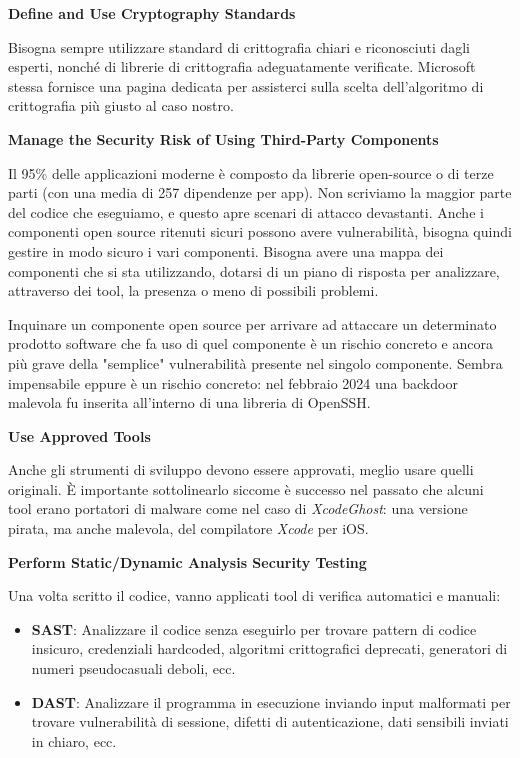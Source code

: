\textbf{Define and Use Cryptography Standards}

Bisogna sempre utilizzare standard di crittografia chiari e riconosciuti dagli esperti, 
nonché di librerie di crittografia adeguatamente verificate. Microsoft stessa fornisce 
una pagina dedicata per assisterci sulla scelta dell'algoritmo di crittografia più 
giusto al caso nostro.

\textbf{Manage the Security Risk of Using Third-Party Components}

Il 95\% delle applicazioni moderne è composto da librerie open-source o di terze 
parti (con una media di 257 dipendenze per app). Non scriviamo la maggior parte del 
codice che eseguiamo, e questo apre scenari di attacco devastanti. Anche i componenti 
open source ritenuti sicuri possono avere vulnerabilità, bisogna quindi gestire in 
modo sicuro i vari componenti. Bisogna avere una mappa dei componenti che si sta 
utilizzando, dotarsi di un piano di risposta per analizzare, attraverso dei tool, la 
presenza o meno di possibili problemi. 

Inquinare un componente open source per arrivare ad attaccare un determinato prodotto 
software che fa uso di quel componente è un rischio concreto e ancora più grave della 
"semplice" vulnerabilità presente nel singolo componente. Sembra impensabile eppure è un 
rischio concreto: nel febbraio 2024 una backdoor malevola fu inserita all'interno di una 
libreria di OpenSSH.

\textbf{Use Approved Tools}

Anche gli strumenti di sviluppo devono essere approvati, meglio usare quelli originali.
È importante sottolinearlo siccome è successo nel passato che alcuni tool erano portatori
di malware come nel caso di \textit{XcodeGhost}: una versione pirata, ma anche malevola, 
del compilatore \textit{Xcode} per iOS.

\textbf{Perform Static/Dynamic Analysis Security Testing}

Una volta scritto il codice, vanno applicati tool di verifica automatici e manuali:

\begin{itemize}
    \item \textbf{SAST}: Analizzare il codice senza eseguirlo per trovare pattern di 
    codice insicuro, credenziali hardcoded, algoritmi crittografici deprecati, generatori 
    di numeri pseudocasuali deboli, ecc.
    \item \textbf{DAST}: Analizzare il programma in esecuzione inviando input malformati 
    per trovare vulnerabilità di sessione, difetti di autenticazione, dati sensibili 
    inviati in chiaro, ecc.
\end{itemize}

